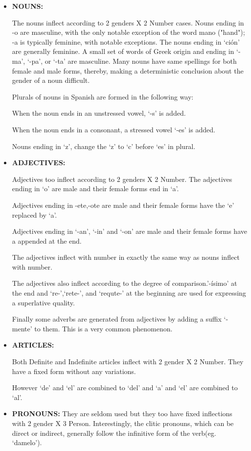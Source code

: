 \documentclass[11pt,letterpaper]{article}
\begin{document}
\begin{itemize}
\item 
{\bf NOUNS:}

The nouns inflect according to 2 genders X 2 Number cases. Nouns ending in -o are masculine, with the only notable exception of the word mano ("hand"); -a is typically feminine, with notable exceptions.
The nouns ending in `ción' are generally feminine.
A small set of words of Greek origin and ending in `-ma', `-pa', or `-ta' are masculine. Many nouns have same spellings for both female and male forms, thereby, making a deterministic conclusion about the gender of a noun difficult.

Plurals of nouns in Spanish  are formed in the following way:

	When the noun ends in an unstressed vowel, `-s' is added.

	When the noun ends in a consonant, a stressed vowel `-es' is added.

Nouns ending in `z', change the `z' to `c' before `es' in plural.

\item
{\bf ADJECTIVES:}

Adjectives too inflect according to 2 genders X 2 Number. The adjectives ending in `o' are male and their female forms end in `a'.

Adjectives ending in -ete,-ote are male and their female forms have the `e' replaced by `a'.

Adjectives ending in `-an', `-in' and `-on' are male and their female forms have a appended at the end.

The adjectives inflect with number in exactly the same way as nouns inflect with number.

The adjectives also inflect according to the degree of comparison.'-ísimo' at the end and `re-',`rete-', and `requte-' at the beginning are used for expressing a superlative quality.

Finally some adverbs are generated from adjectives by adding a suffix `-mente' to them. This is a very common phenomenon.

\item
{\bf ARTICLES:}

Both Definite and Indefinite articles inflect with 2 gender X 2 Number. They have a fixed form without any variations.

However `de' and `el' are combined to `del' and `a' and `el' are combined to `al'.

\item
{\bf PRONOUNS:}
They are seldom used but they too have fixed inflections with 2 gender X 3 Person. Interestingly, the clitic pronouns, which can be direct or indirect, generally follow the infinitive form of the verb(eg. `damelo'). 

\end{itemize}  
\end{document}

